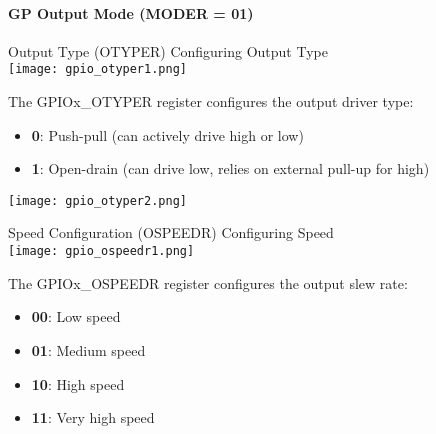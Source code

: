 \paragraph{GP Output Mode (MODER = 01)}

\begin{concept}{Output Type (OTYPER)} Configuring Output Type\\
    \texttt{[image: gpio\_otyper1.png]}

    \begin{minipage}{0.6\linewidth}
    The GPIOx\_OTYPER register configures the output driver type:
    \begin{itemize}
        \item \textbf{0}: Push-pull (can actively drive high or low)
        \item \textbf{1}: Open-drain (can drive low, relies on external pull-up for high)
    \end{itemize}
    \end{minipage}
    \begin{minipage}{0.4\linewidth}
        \texttt{[image: gpio\_otyper2.png]}
    \end{minipage}
\end{concept}

\begin{concept}{Speed Configuration (OSPEEDR)} Configuring Speed\\
    \texttt{[image: gpio\_ospeedr1.png]}
   
    The GPIOx\_OSPEEDR register configures the output slew rate:
    \begin{itemize}
        \item \textbf{00}: Low speed
        \item \textbf{01}: Medium speed
        \item \textbf{10}: High speed
        \item \textbf{11}: Very high speed
    \end{itemize}
\end{concept}

